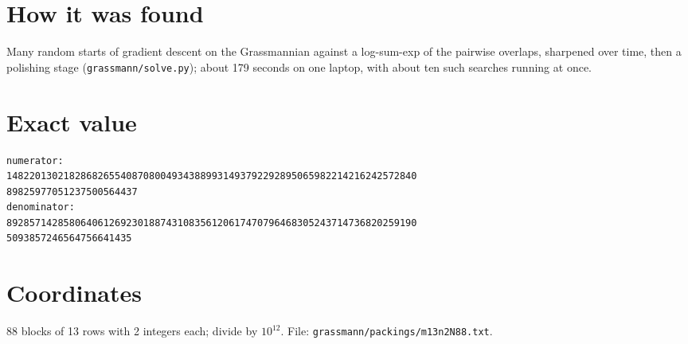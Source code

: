 \documentclass[11pt,a4paper]{article}
\begin{document}
\section{How it was found}
Many random starts of gradient descent on the Grassmannian against a log-sum-exp of the pairwise overlaps, sharpened over time, then a polishing stage (\texttt{grassmann/solve.py}); about 179 seconds on one laptop, with about ten such searches running at once.


\appendix
\section{Exact value}
{\small
\begin{verbatim}
numerator:
148220130218286826554087080049343889931493792292895065982214216242572840
89825977051237500564437
denominator:
892857142858064061269230188743108356120617470796468305243714736820259190
5093857246564756641435
\end{verbatim}}

\section{Coordinates}
88 blocks of 13 rows with 2 integers each; divide by $10^{12}$. File: \texttt{grassmann/packings/m13n2N88.txt}.
{\tiny
\begin{multicols}{4}
\end{multicols}}
\end{document}
